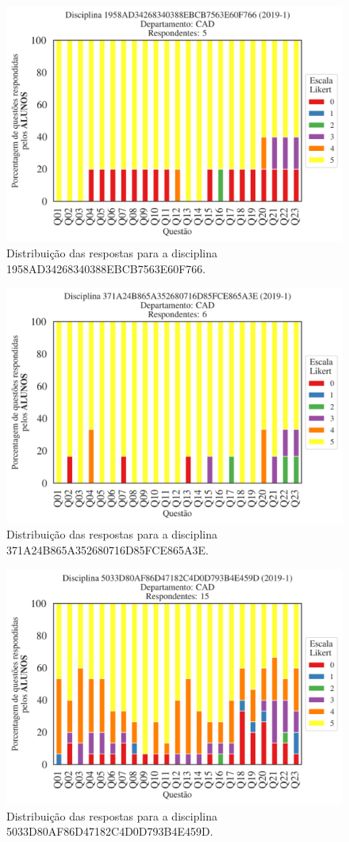 \documentclass[a4paper,10pt]{article}
\begin{document}
\begin{figure}[h]
\centering
\includegraphics[width=0.485\linewidth]{analise_disciplina_departamento_CAD_ALUNO_TURMA_1958AD34268340388EBCB7563E60F766.png}
\caption{\label{fig:analise_geral_departamento}                Distribuição das respostas para a disciplina 1958AD34268340388EBCB7563E60F766.}
\end{figure}
\begin{figure}[h]
\centering
\includegraphics[width=0.485\linewidth]{analise_disciplina_departamento_CAD_ALUNO_TURMA_371A24B865A352680716D85FCE865A3E.png}
\caption{\label{fig:analise_geral_departamento}                Distribuição das respostas para a disciplina 371A24B865A352680716D85FCE865A3E.}
\end{figure}
\begin{figure}[h]
\centering
\includegraphics[width=0.485\linewidth]{analise_disciplina_departamento_CAD_ALUNO_TURMA_5033D80AF86D47182C4D0D793B4E459D.png}
\caption{\label{fig:analise_geral_departamento}                Distribuição das respostas para a disciplina 5033D80AF86D47182C4D0D793B4E459D.}
\end{figure}
\end{document}
